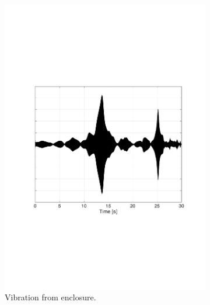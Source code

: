 \begin{figure}[H]
\begin{subfigure}[t]{0.3\textwidth}
	\includegraphics[width=1\textwidth]{figures/raw_enclosure14.pdf}
	\caption{Vibration from enclosure.}
	\label{fig:raw_enclosure14}
\end{subfigure}
\begin{subfigure}[t]{0.3\textwidth}

\end{subfigure}
\end{figure}
